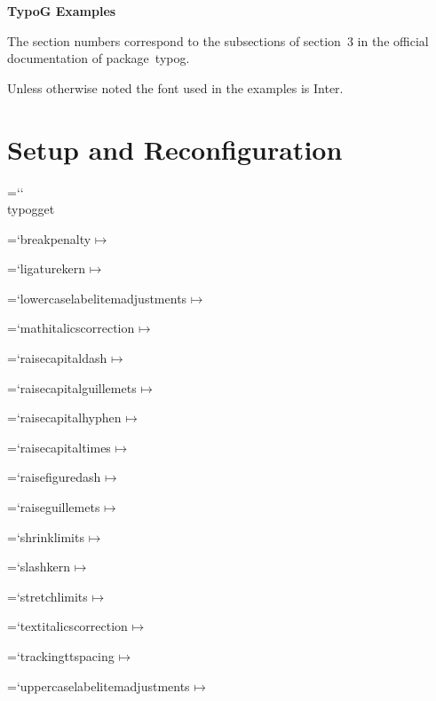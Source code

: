 \documentclass[a4paper]{article}
\def\examplefontname{default}
\def\examplefontname{Nunito}
\def\examplefontname{OpenSans}
\def\examplefontname{Noto Sans}
\def\examplefontname{Roboto}
\def\examplefontname{Montserrat Alternates}
\def\examplefontname{Inter}
\newcommand*{\code}[1]{{\ttfamily\hyphenchar\font=`\-\relax #1}}
\newcommand*{\packagename}[1]{\mbox{\textsf{#1}}}
\newcommand*{\singlequotes}[1]{\singleguillemetright#1\singleguillemetleft}
\begin{document}
\fussy
{}
\nonfrenchspacing

\begin{center}
  \Huge\bf\sf
  TypoG Examples
\end{center}

\bigskip

\noindent
The section numbers correspond to the subsections of section~3
in the official documentation of package~\packagename{typog}.

\bigskip

\tableofcontents

\clearpage
{}

\clearpage
\noindent
Unless otherwise noted the font used in the examples is \singlequotes{\examplefontname}.

\section{Setup and Reconfiguration}

\noindent
\code{\char`\\ typogget}

\begin{list}{}{}
  \newcommand*{\expandsto}{$\mathbin{\mapsto}$}
\item \code{breakpenalty} \expandsto{} \the{}
\item \code{ligaturekern} \expandsto{} 
\item \code{lowercaselabelitemadjustments} \expandsto{} 
\item \code{mathitalicscorrection} \expandsto{} \the{}
\item \code{raisecapitaldash} \expandsto{} \the{}
\item \code{raisecapitalguillemets} \expandsto{} \the{}
\item \code{raisecapitalhyphen} \expandsto{} \the{}
\item \code{raisecapitaltimes} \expandsto{} \the{}
\item \code{raisefiguredash} \expandsto{} \the{}
\item \code{raiseguillemets} \expandsto{} \the{}
\item \code{shrinklimits} \expandsto{} 
\item \code{slashkern} \expandsto{} \the{}
\item \code{stretchlimits} \expandsto{} 
\item \code{textitalicscorrection} \expandsto{} \the{}
\item \code{trackingttspacing} \expandsto{} 
\item \code{uppercaselabelitemadjustments} \expandsto{} 
\end{list}
\end{document}
